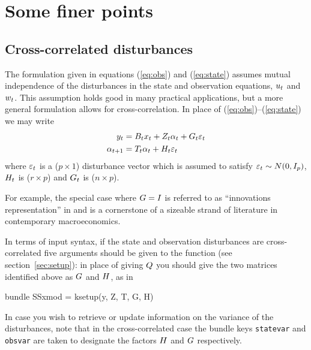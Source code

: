
\section{Some finer points}
\label{sec:finer}

\subsection{Cross-correlated disturbances}
\label{sec:crossd}

The formulation given in equations (\ref{eq:obs}) and (\ref{eq:state})
assumes mutual independence of the disturbances in the state and
observation equations, $u_t$ and $w_t$.  This assumption
holds good in many practical applications, but a more general
formulation allows for cross-correlation.  In place of
(\ref{eq:obs})--(\ref{eq:state}) we may write
%
\begin{align*}
  y_t &= B_tx_t + Z_t \alpha_t +
     G_t \varepsilon_t \\
  \alpha_{t+1} &= T_t \alpha_t +
     H_t \varepsilon_t
\end{align*}
%
where $\varepsilon_t$ is a ($p \times 1$) disturbance vector which is
assumed to satisfy $\varepsilon_t \sim N(0, I_p)$, $H_t$ is
($r \times p$) and $G_t$ is ($n \times p$).

For example, the special case where $G = I$ is referred to as
``innovations representation'' in \cite{hansen-sargent2013} and is a
cornerstone of a sizeable strand of literature in contemporary
macroeconomics.

In terms of input syntax, if the state and observation disturbances
are cross-correlated five arguments should be given to the
 function (see section~\ref{sec:setup}): in place of
giving $Q$ you should give the two matrices identified above as
$G$ and $H$, as in
\begin{code}
bundle SSxmod = ksetup(y, Z, T, G, H)
\end{code}

In case you wish to retrieve or update information on the variance of
the disturbances, note that in the cross-correlated case the bundle
keys \texttt{statevar} and \texttt{obsvar} are taken to designate the
factors $H$ and $G$ respectively.

